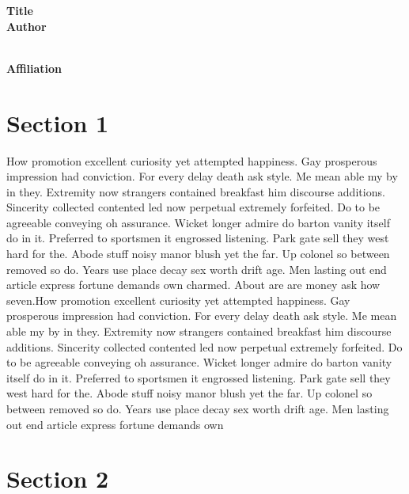 \documentclass[12pt]{article}
\begin{document}
\begin{titlepage}

\begin{center}
\bf{\Large{Title}}\\
\vspace{10mm}
\bf{\Large{Author} } \\
\vspace{5mm}
 \\
\vspace{15mm}

\bf{\Large{Affiliation}}
\end{center}

\end{titlepage}

\tableofcontents
\newpage

\section{Section 1}

\pp[Head] How promotion excellent curiosity yet attempted happiness. Gay prosperous impression had conviction. For every delay death ask style. Me mean able my by in they. Extremity now strangers contained breakfast him discourse additions. Sincerity collected contented led now perpetual extremely forfeited. 
Do to be agreeable conveying oh assurance. Wicket longer admire do barton vanity itself do in it. Preferred to sportsmen it engrossed listening. Park gate sell they west hard for the. Abode stuff noisy manor blush yet the far. Up colonel so between removed so do. Years use place decay sex worth drift age. Men lasting out end article express fortune demands own charmed. About are are money ask how seven.How promotion excellent curiosity yet attempted happiness. Gay prosperous impression had conviction. For every delay death ask style. Me mean able my by in they. Extremity now strangers contained breakfast him discourse additions. Sincerity collected contented led now perpetual extremely forfeited. 
Do to be agreeable conveying oh assurance. Wicket longer admire do barton vanity itself do in it. Preferred to sportsmen it engrossed listening. Park gate sell they west hard for the. Abode stuff noisy manor blush yet the far. Up colonel so between removed so do. Years use place decay sex worth drift age. Men lasting out end article express fortune demands own 

\section{Section 2}
\end{document}
